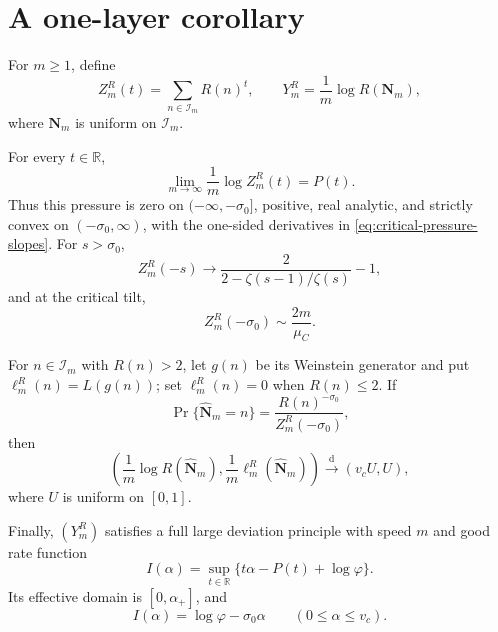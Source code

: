 \section{A one-layer corollary}
\label{sec:standard-thermodynamics}

For \(m\ge1\), define
\[
 Z_m^R(t)=\sum_{n\in\mathcal I_m}R(n)^t,
 \qquad
 Y_m^R=\frac1m\log R(\mathbf N_m),
\]
where \(\mathbf N_m\) is uniform on \(\mathcal I_m\).

\begin{corollary}
\label{thm:standard-fibonacci-thermodynamics}
For every \(t\in\mathbb R\),
\begin{equation}
 \lim_{m\to\infty}\frac1m\log Z_m^R(t)=P(t).
 \label{eq:standard-layer-pressure}
\end{equation}
Thus this pressure is zero on \(( -\infty,-\sigma_0]\), positive, real
analytic, and strictly convex on \(( -\sigma_0,\infty)\), with the one-sided
derivatives in \eqref{eq:critical-pressure-slopes}.  For \(s>\sigma_0\),
\begin{equation}
 Z_m^R(-s)\longrightarrow
 \frac2{2-\zeta(s-1)/\zeta(s)}-1,
 \label{eq:standard-layer-frozen-limit}
\end{equation}
and at the critical tilt,
\begin{equation}
 Z_m^R(-\sigma_0)\sim\frac{2m}{\mu_C}.
 \label{eq:standard-layer-critical-size}
\end{equation}

For \(n\in\mathcal I_m\) with \(R(n)>2\), let \(g(n)\) be its Weinstein
generator and put \(\ell_m^R(n)=L(g(n))\); set \(\ell_m^R(n)=0\) when
\(R(n)\le2\).  If
\[
 \Pr\{\widehat{\mathbf N}_m=n\}
 =\frac{R(n)^{-\sigma_0}}{Z_m^R(-\sigma_0)},
\]
then
\begin{equation}
 \left(\frac1m\log R(\widehat{\mathbf N}_m),
       \frac1m\ell_m^R(\widehat{\mathbf N}_m)\right)
 \xrightarrow{\mathrm d}(v_cU,U),
 \label{eq:standard-layer-critical-gibbs}
\end{equation}
where \(U\) is uniform on \([0,1]\).

Finally, \((Y_m^R)\) satisfies a full large deviation principle with speed
\(m\) and good rate function
\begin{equation}
 I(\alpha)=\sup_{t\in\mathbb R}
 \{t\alpha-P(t)+\log\varphi\}.
 \label{eq:standard-layer-ldp-rate}
\end{equation}
Its effective domain is \([0,\alpha_+]\), and
\[
 I(\alpha)=\log\varphi-\sigma_0\alpha
 \qquad(0\le\alpha\le v_c).
\]
\end{corollary}

